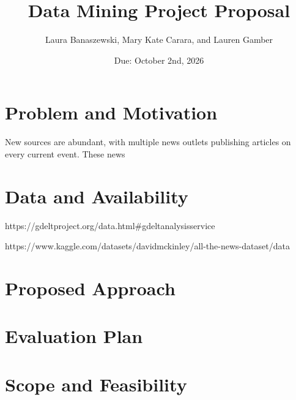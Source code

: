 \documentclass{article}
\title{Data Mining Project Proposal}
\author{Laura Banaszewski, Mary Kate Carara, and Lauren Gamber}
\date{Due: October 2nd, 2026}
\begin{document}
\maketitle

\section{Problem and Motivation}
New sources are abundant, with multiple news outlets publishing articles on every current event. These news    


\section{Data and Availability}
https://gdeltproject.org/data.html#gdeltanalysisservice

https://www.kaggle.com/datasets/davidmckinley/all-the-news-dataset/data




\section{Proposed Approach}

\section{Evaluation Plan}

\section{Scope and Feasibility}
\end{document}
